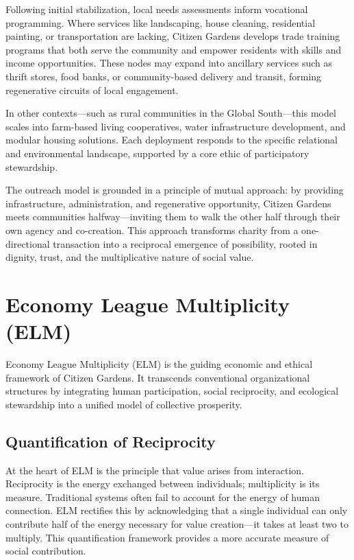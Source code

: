 \documentclass[12pt]{article}
\begin{document}
Following initial stabilization, local needs assessments inform vocational programming. Where services like landscaping, house cleaning, residential painting, or transportation are lacking, Citizen Gardens develops trade training programs that both serve the community and empower residents with skills and income opportunities. These nodes may expand into ancillary services such as thrift stores, food banks, or community-based delivery and transit, forming regenerative circuits of local engagement.

In other contexts—such as rural communities in the Global South—this model scales into farm-based living cooperatives, water infrastructure development, and modular housing solutions. Each deployment responds to the specific relational and environmental landscape, supported by a core ethic of participatory stewardship.

The outreach model is grounded in a principle of mutual approach: by providing infrastructure, administration, and regenerative opportunity, Citizen Gardens meets communities halfway—inviting them to walk the other half through their own agency and co-creation. This approach transforms charity from a one-directional transaction into a reciprocal emergence of possibility, rooted in dignity, trust, and the multiplicative nature of social value.


\section{Economy League Multiplicity (ELM)}

Economy League Multiplicity (ELM) is the guiding economic and ethical framework of Citizen Gardens. It transcends conventional organizational structures by integrating human participation, social reciprocity, and ecological stewardship into a unified model of collective prosperity.

\subsection{Quantification of Reciprocity}

At the heart of ELM is the principle that value arises from interaction. Reciprocity is the energy exchanged between individuals; multiplicity is its measure. Traditional systems often fail to account for the energy of human connection. ELM rectifies this by acknowledging that a single individual can only contribute half of the energy necessary for value creation---it takes at least two to multiply. This quantification framework provides a more accurate measure of social contribution.
\end{document}
